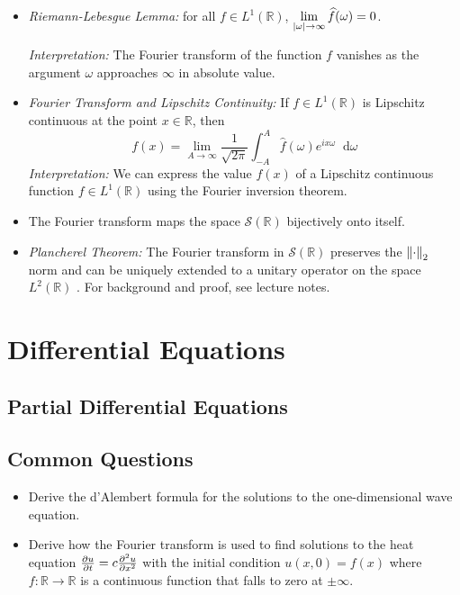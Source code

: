 \documentclass[11pt, a4paper]{article}
\newcommand{\R}{\mathbb{R}} %
\newcommand{\diff}{\mathop{}\!\mathrm{d}} %
\begin{document}
\begin{itemize}
	\item \textit{Riemann-Lebesgue Lemma:} for all $ f \in L^{1}(\R) $, $ \displaystyle{\lim_{\abs{\omega} \to \infty} \widehat{f}(\omega) = 0} $.
	
	\textit{Interpretation:} The Fourier transform of the function $ f $ vanishes as the argument $ \omega $ approaches $ \infty $ in absolute value.
	
	\item \textit{Fourier Transform and Lipschitz Continuity:} If $ f \in L^{1}(\R) $ is Lipschitz continuous at the point $ x \in \R $, then
	\begin{equation*}
		f(x) = \lim_{A \to \infty} \frac{1}{\sqrt{2\pi}} \int_{-A}^{A} \widehat{f}(\omega) e^{ix\omega} \diff \omega
	\end{equation*}
	\textit{Interpretation:} We can express the value $ f(x) $ of a Lipschitz continuous function $ f \in L^{1}(\R) $ using the Fourier inversion theorem.
	
	\item The Fourier transform maps the space $ \mathcal{S}(\R) $ bijectively onto itself.
	
	\item \textit{Plancherel Theorem:} The Fourier transform in $ \mathcal{S}(\R) $ preserves the $ \norm{\cdot}_{2} $ norm and can be uniquely extended to a unitary operator on the space $ L^{2}(\R) $ . For background and proof, see lecture notes.
\end{itemize}

\newpage

\section{Differential Equations}

\subsection{Partial Differential Equations}

\subsection{Common Questions}
\begin{itemize}
	\item Derive the d'Alembert formula for the solutions to the one-dimensional wave equation.
	\item Derive how the Fourier transform is used to find solutions to the heat equation $ \pdv{u}{t} = c \pdv[2]{u}{x} $ with the initial condition $ u(x, 0) = f(x) $ where $ f: \R \to \R $ is a continuous function that falls to zero at $ \pm \infty $.
\end{itemize}
\end{document}
